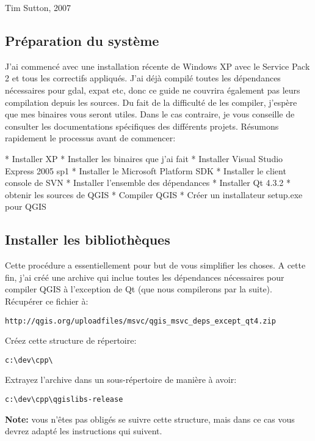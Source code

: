 Tim Sutton, 2007

\subsection{Préparation du système}
J'ai commencé avec une installation récente de Windows XP avec le Service Pack 2 et tous les correctifs appliqués. J'ai déjà compilé toutes les dépendances nécessaires pour gdal, expat etc, donc ce guide ne couvrira également pas leurs compilation depuis les sources. Du fait de la difficulté de les compiler, j'espère que mes binaires vous seront utiles. Dans le cas contraire, je vous conseille de consulter les documentations spécifiques des différents projets. Résumons rapidement le processus avant de commencer:

 * Installer XP 
 * Installer les binaires que j'ai fait
 * Installer Visual Studio Express 2005 sp1
 * Installer le Microsoft Platform SDK
 * Installer le client console de SVN
 * Installer l'ensemble des dépendances
 * Installer Qt 4.3.2
 * obtenir les sources de QGIS
 * Compiler QGIS
 * Créer un installateur setup.exe pour QGIS

\subsection{Installer les bibliothèques}
Cette procédure a essentiellement pour but de vous simplifier les choses. A cette fin, j'ai créé une archive qui inclue  toutes les dépendances nécessaires pour compiler QGIS à l'exception de Qt (que nous compilerons par la suite). Récupérer ce fichier à:

\begin{verbatim}
http://qgis.org/uploadfiles/msvc/qgis_msvc_deps_except_qt4.zip
\end{verbatim}

Créez cette structure de répertoire:

\begin{verbatim}
c:\dev\cpp\
\end{verbatim}

Extrayez l'archive dans un sous-répertoire de manière à avoir:

\begin{verbatim}
c:\dev\cpp\qgislibs-release
\end{verbatim}

\textbf{Note:} vous n'êtes pas obligés se suivre cette structure, mais dans ce cas vous devrez adapté les instructions qui suivent.

